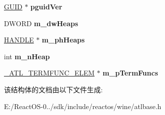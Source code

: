 \begin{DoxyCompactItemize}
\hyperlink{interface_g_u_i_d}{G\+U\+ID} $\ast$ {\bfseries pguid\+Ver}
\item 
\mbox{\label{struct___a_t_l___m_o_d_u_l_e_w___t_a_g_ad8bb7456ea60768d4570be348bd49480}} 
D\+W\+O\+RD {\bfseries m\+\_\+dw\+Heaps}
\item 
\mbox{\label{struct___a_t_l___m_o_d_u_l_e_w___t_a_g_a71d0b97e65587f74fa5a61b4239f0d0c}} 
\hyperlink{interfacevoid}{H\+A\+N\+D\+LE} $\ast$ {\bfseries m\+\_\+ph\+Heaps}
\item 
\mbox{\label{struct___a_t_l___m_o_d_u_l_e_w___t_a_g_a0a6905d77ad7f8724dacd7a8094ecd89}} 
int {\bfseries m\+\_\+n\+Heap}
\item 
\mbox{\label{struct___a_t_l___m_o_d_u_l_e_w___t_a_g_a0cadbc4d248c51ca303379815f0a196c}} 
\hyperlink{struct___a_t_l___t_e_r_m_f_u_n_c___e_l_e_m___t_a_g}{\+\_\+\+A\+T\+L\+\_\+\+T\+E\+R\+M\+F\+U\+N\+C\+\_\+\+E\+L\+EM} $\ast$ {\bfseries m\+\_\+p\+Term\+Funcs}
\end{DoxyCompactItemize}


该结构体的文档由以下文件生成\+:\begin{DoxyCompactItemize}
\item 
E\+:/\+React\+O\+S-\/0../sdk/include/reactos/wine/atlbase.\+h\end{DoxyCompactItemize}
